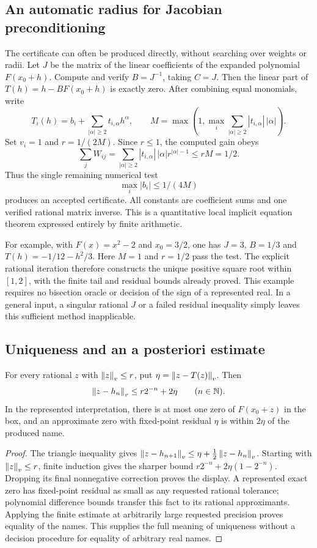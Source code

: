 \subsection{An automatic radius for Jacobian preconditioning}

The certificate can often be produced directly, without searching over
weights or radii. Let $J$ be the matrix of the linear coefficients of the
expanded polynomial $F(x_0+h)$. Compute and verify $B=J^{-1}$, taking
$C=J$. Then the linear part of $T(h)=h-BF(x_0+h)$ is exactly zero.
After combining equal monomials, write
\[
 T_i(h)=b_i+\sum_{|\alpha|\ge2}t_{i,\alpha}h^\alpha,
 \qquad
 M=\max\left(1,\max_i\sum_{|\alpha|\ge2}
                   |t_{i,\alpha}|\,|\alpha|\right).
\]
Set $v_i=1$ and $r=1/(2M)$. Since $r\le1$, the computed gain obeys
\[
 \sum_j W_{ij}
 =\sum_{|\alpha|\ge2}|t_{i,\alpha}|\,|\alpha|r^{|\alpha|-1}
 \le rM=1/2.
\]
Thus the single remaining numerical test
\[
                 \max_i|b_i|\le 1/(4M)
\]
produces an accepted certificate. All constants are coefficient sums and
one verified rational matrix inverse. This is a quantitative local implicit
equation theorem expressed entirely by finite arithmetic.

For example, with $F(x)=x^2-2$ and $x_0=3/2$, one has $J=3$, $B=1/3$ and
$T(h)=-1/12-h^2/3$. Here $M=1$ and $r=1/2$ pass the test. The explicit
rational iteration therefore constructs the unique positive square root
within $[1,2]$, with the finite tail and residual bounds already proved.
This example requires no bisection oracle or decision of the sign of a
represented real. In a general input, a singular rational $J$ or a failed
residual inequality simply leaves this sufficient method inapplicable.

\subsection{Uniqueness and an a posteriori estimate}

\begin{proposition}\label{prop:polyapost}
For every rational \(z\) with \(\left\lVert z\right\rVert_v\le r\), put \(\eta=\left\lVert z-T(z)\right\rVert_v\). Then
\[
 \left\lVert z-h_n\right\rVert_v\le r2^{-n}+2\eta\qquad(n\in\mathbb N).
\]
In the represented interpretation, there is at most one zero of \(F(x_0+z)\) in the box, and an approximate zero with fixed-point residual \(\eta\) is within \(2\eta\) of the produced name.
\end{proposition}
\begin{proof}
The triangle inequality gives
\(\left\lVert z-h_{n+1}\right\rVert_v\le\eta+\tfrac12\left\lVert z-h_n\right\rVert_v\).
Starting with \(\left\lVert z\right\rVert_v\le r\), finite induction gives the sharper bound
\(r2^{-n}+2\eta(1-2^{-n})\). Dropping its final nonnegative correction proves the display. A represented exact zero has fixed-point residual as small as any requested rational tolerance; polynomial difference bounds transfer this fact to its rational approximants. Applying the finite estimate at arbitrarily large requested precision proves equality of the names. This supplies the full meaning of uniqueness without a decision procedure for equality of arbitrary real names.
\end{proof}

